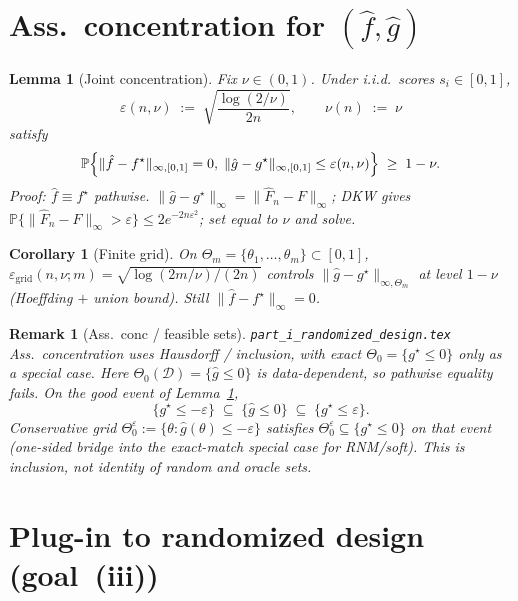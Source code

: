 \documentclass[11pt]{article}
\newtheorem{lemma}{Lemma}
\newtheorem{corollary}{Corollary}
\newtheorem{remark}{Remark}
\begin{document}
\section{Ass.\ concentration for $(\hat f,\hat g)$}

\begin{lemma}[Joint concentration]
\label{lem:conc}
Fix $\nu\in(0,1)$. Under i.i.d.\ scores $s_i\in[0,1]$,
\begin{equation}
\label{eq:eps-nu}
\varepsilon(n,\nu)
\;:=\;
\sqrt{\frac{\log(2/\nu)}{2n}},
\qquad
\nu(n)\;:=\;\nu
\end{equation}
satisfy
\[
\mathbb{P}\Bigl\{\|\hat f-f^\star\|_{\infty,[0,1]}=0,\;
\|\hat g-g^\star\|_{\infty,[0,1]}\le\varepsilon(n,\nu)\Bigr\}
\;\ge\; 1-\nu.
\]
\textit{Proof:} $\hat f\equiv f^\star$ pathwise.
$\|\hat g-g^\star\|_\infty=\|\widehat F_n-F\|_\infty$; DKW gives
$\mathbb{P}\{\|\widehat F_n-F\|_\infty>\varepsilon\}\le 2e^{-2n\varepsilon^2}$; set equal to $\nu$ and solve.
\end{lemma}

\begin{corollary}[Finite grid]
\label{cor:grid}
On $\Theta_m=\{\theta_1,\ldots,\theta_m\}\subset[0,1]$,
$\varepsilon_{\mathrm{grid}}(n,\nu;m)=\sqrt{\log(2m/\nu)/(2n)}$
controls $\|\hat g-g^\star\|_{\infty,\Theta_m}$ at level $1-\nu$
(Hoeffding $+$ union bound). Still $\|\hat f-f^\star\|_\infty=0$.
\end{corollary}

\begin{remark}[Ass.\ conc / feasible sets]
\label{rem:hausdorff}
\texttt{part\_i\_randomized\_design.tex} Ass.\ concentration uses Hausdorff / inclusion,
with exact $\Theta_0=\{g^\star\le 0\}$ only as a special case.
Here $\Theta_0(\mathcal{D})=\{\hat g\le 0\}$ is data-dependent, so pathwise equality fails.
On the good event of Lemma~\ref{lem:conc},
\[
\{g^\star\le -\varepsilon\}\;\subseteq\;\{\hat g\le 0\}\;\subseteq\;\{g^\star\le\varepsilon\}.
\]
Conservative grid $\Theta_0^\varepsilon:=\{\theta:\hat g(\theta)\le-\varepsilon\}$ satisfies
$\Theta_0^\varepsilon\subseteq\{g^\star\le 0\}$ on that event (one-sided bridge into the
exact-match special case for RNM/soft). This is inclusion, not identity of random and
oracle sets.
\end{remark}

\section{Plug-in to randomized design (goal~(iii))}
\end{document}
